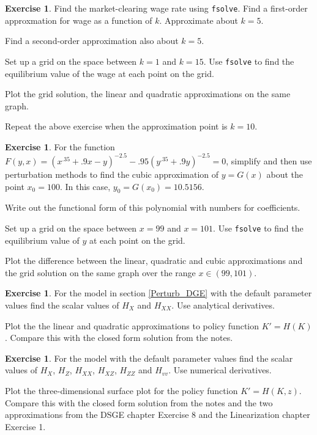 \documentclass[letterpaper,12pt]{article}
\theoremstyle{definition}
\newtheorem{exercise}[theorem]{Exercise}
\begin{document}
\begin{spacing}{1.5}
\begin{exercise}
		Find the market-clearing wage rate using {\tt fsolve}.  Find a first-order approxmation for wage as a function of $k$.  Approximate about $k=5$.  

		Find a second-order approximation also about $k=5$.

		Set up a grid on the space between $k=1$ and $k=15$. Use {\tt fsolve} to find the equilibrium value of the wage at each point on the grid.

		Plot the grid solution, the linear and quadratic approximations on the same graph.

		Repeat the above exercise when the approximation point is $k=10$.
	\end{exercise}

	\begin{exercise} \label{Perturb_HW_Bivar_Grid}
		For the function $F(y,x) =(x^{.35} + .9x - y)^{-2.5} - .95(y^{.35} + .9y )^{-2.5} = 0$, simplify and then use perturbation methods to find the cubic approximation of $y=G(x)$ about the point $x_0=100$.  In this case, $y_0=G(x_0)=10.5156$.

		Write out the functional form of this polynomial with numbers for coefficients.

		Set up a grid on the space between $x=99$ and $x=101$. Use {\tt fsolve} to find the equilibrium value of $y$ at each point on the grid.

		Plot the difference between the linear, quadratic and cubic approximations and the grid solution on the same graph over the range $x\in(99,101)$.
	\end{exercise}

	\begin{exercise} \label{Perturb_HW_BM_NoStoch}
		For the \citet{BrockMirman1972} model in section \ref{Perturb_DGE} with the default parameter values find the scalar values of $H_X$ and $H_{XX}$.  Use analytical derivatives.

		Plot the the linear and quadratic approximations to policy function $K' = H(K)$.  Compare this with the closed form solution from the notes.
	\end{exercise}

	\begin{exercise} \label{Perturb_HW_BM}
		For the \citet{BrockMirman1972} model with the default parameter values find the scalar values of $H_X$, $H_Z$, $H_{XX}$, $H_{XZ}$, $H_{ZZ}$ and $H_{vv}$.  Use numerical derivatives.

		Plot the three-dimensional surface plot for the policy function $K' = H(K,z)$.  Compare this with the closed form solution from the notes and the two approximations from the DSGE chapter Exercise 8 and the Linearization chapter Exercise 1.
	\end{exercise}


\end{spacing}
\end{document}
